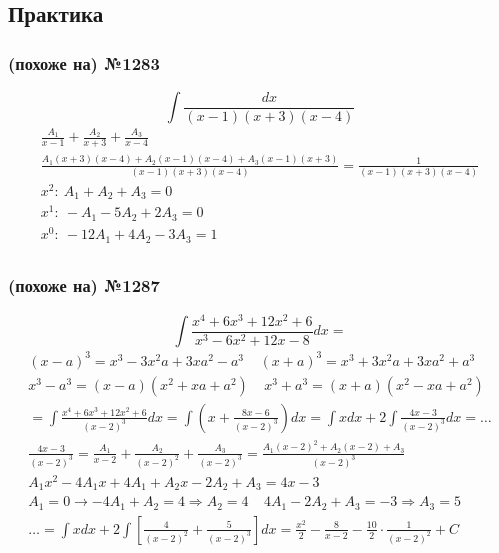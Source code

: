 \documentclass{article}
\begin{document}
\subsection{Практика}

\subsubsection{(похоже на) №1283}
\[
    \int \frac{dx}{(x - 1)(x + 3)(x - 4)}
\]
\begin{gather*}
    \frac{A_1}{x - 1} + \frac{A_2}{x + 3} + \frac{A_3}{x - 4} \\
    \frac{A_1(x + 3)(x - 4) + A_2(x - 1)(x - 4) + A_3(x - 1)(x + 3)}{(x - 1)(x + 3)(x - 4)} = 
    \frac{1}{(x - 1)(x + 3)(x - 4)} \\
    x^2:~    A_1 +  A_2 +  A_3 = 0 \\
    x^1:~   -A_1 - 5A_2 + 2A_3 = 0 \\
    x^0:~ -12A_1 + 4A_2 - 3A_3 = 1 \\
\end{gather*}

\subsubsection{(похоже на) №1287}
\[
    \int \frac{x^4 + 6x^3 + 12x^2 + 6}{x^3 - 6x^2 + 12x - 8} dx =
\]
\begin{gather*}
    (x - a)^3 = x^3 - 3x^2a + 3xa^2 - a^3 ~~~~~
    (x + a)^3 = x^3 + 3x^2a + 3xa^2 + a^3 \\
    x^3 - a^3 = (x - a)(x^2 + xa + a^2)   ~~~~~
    x^3 + a^3 = (x + a)(x^2 - xa + a^2)   \\
    = \int \frac{x^4 + 6x^3 + 12x^2 + 6}{(x - 2)^3} dx = 
      \int \left(x + \frac{8x - 6}{(x - 2)^3}\right) dx =
      \int x dx + 2 \int \frac{4x - 3}{(x - 2)^3} dx = \dots \\
      \frac{4x - 3}{(x - 2)^3} = \frac{A_1}{x - 2} + \frac{A_2}{(x - 2)^2} + \frac{A_3}{(x - 2)^3} =
      \frac{A_1(x - 2)^2 + A_2(x - 2) + A_3}{(x - 2)^3} \\
      A_1 x^2 - 4 A_1 x + 4A_1 + A_2 x - 2 A_2 + A_3 = 4x - 3 \\
      A_1 = 0 \rightarrow -4A_1 + A_2 = 4 \Rightarrow A_2 = 4 ~~~~~
      4A_1 - 2A_2 + A_3 = -3 \Rightarrow A_3 = 5 \\
      \dots = \int x dx + 2 \int \left[ \frac{4}{(x - 2)^2} + \frac{5}{(x - 2)^3} \right] dx =
      \frac{x^2}{2} - \frac{8}{x - 2} - \frac{10}{2} \cdot \frac{1}{(x - 2)^2} + C
\end{gather*}
\end{document}
